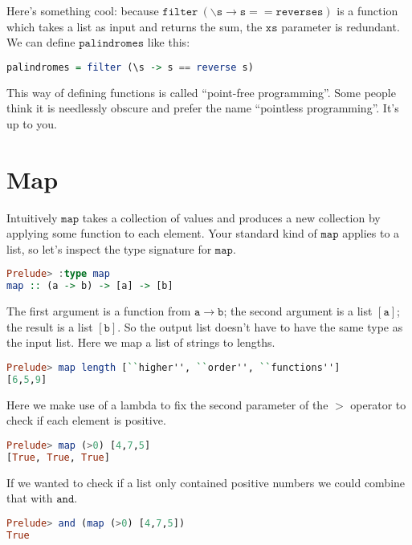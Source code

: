\documentclass[a4paper,12pt]{article}
\newcommand{\kwa}[1]{\mathtt{#1}}
\begin{document}
\noindent
Here's something cool: because $\kwa{filter~ (\backslash  s \rightarrow s == reverse s)}$ is a function which takes a list as input and returns the sum, the $\kwa{xs}$ parameter is redundant. We can define $\kwa{palindromes}$ like this:

\begin{lstlisting}[language=Haskell]
palindromes = filter (\s -> s == reverse s)
\end{lstlisting} 

\noindent
This way of defining functions is called ``point-free programming''. Some people think it is needlessly obscure and prefer the name ``pointless programming''. It's up to you.

\section{Map}

\noindent
Intuitively $\kwa{map}$ takes a collection of values and produces a new collection by applying some function to each element. Your standard kind of $\kwa{map}$ applies to a list, so let's inspect the type signature for $\kwa{map}$.

\begin{lstlisting}[language=Haskell]
Prelude> :type map
map :: (a -> b) -> [a] -> [b]
\end{lstlisting}

\noindent
The first argument is a function from $\kwa{a \rightarrow b}$; the second argument is a list $\kwa{[a]}$; the result is a list $\kwa{[b]}$. So the output list doesn't have to have the same type as the input list. Here we map a list of strings to lengths.

\begin{lstlisting}[language=Haskell]
Prelude> map length [``higher'', ``order'', ``functions'']
[6,5,9]
\end{lstlisting}

\noindent
Here we make use of a lambda to fix the second parameter of the $\kwa{>}$ operator to check if each element is positive.

\begin{lstlisting}[language=Haskell]
Prelude> map (>0) [4,7,5]
[True, True, True]
\end{lstlisting}

\noindent
If we wanted to check if a list only contained positive numbers we could combine that with $\kwa{and}$.

\begin{lstlisting}[language=Haskell]
Prelude> and (map (>0) [4,7,5])
True
 \end{lstlisting}
\end{document}

